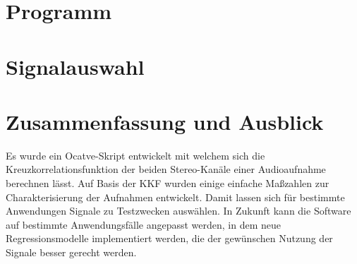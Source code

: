 \section{Programm}

\newpage
\section{Signalauswahl}

\newpage
\section{Zusammenfassung und Ausblick}
Es wurde ein Ocatve-Skript entwickelt mit welchem sich die Kreuzkorrelationsfunktion der beiden Stereo-Kanäle einer Audioaufnahme berechnen lässt. Auf Basis der KKF wurden einige einfache Maßzahlen zur Charakterisierung der Aufnahmen entwickelt. Damit lassen sich für bestimmte Anwendungen Signale zu Testzwecken auswählen.
In Zukunft kann die Software auf bestimmte Anwendungsfälle angepasst werden, in dem neue Regressionsmodelle implementiert werden, die der gewünschen Nutzung der Signale besser gerecht werden.

